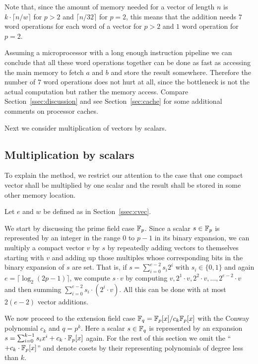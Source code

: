 \begin{Rem}
Note that, since the amount of memory needed for a vector of length $n$
is $k \cdot \lceil n/w \rceil$ for $p > 2$ and $\lceil n/32 \rceil$ for
$p=2$, this means that the addition needs $7$ word operations for each
word of a vector for $p>2$ and $1$ word operation for $p=2$.

Assuming a microprocessor
with a long enough instruction pipeline we can conclude that all these
word operations together
can be done as fast as accessing the main memory to fetch $a$ and $b$ and
store the result somewhere. Therefore the number of $7$ word operations
does not hurt at all, since the bottleneck is not the actual computation
but rather the memory access.
Compare Section~\ref{ssec:discussion} and see Section~\ref{sec:cache}
for some additional comments on processor caches.
\end{Rem}

Next we consider multiplication of vectors by scalars.

\subsection{Multiplication by scalars}

To explain the method, we restrict our attention to the case that one
compact vector shall be multiplied by one scalar and the result 
shall be stored in some other memory location.

Let $e$ and $w$ be defined as in Section~\ref{ssec:cvec}.

We start by discussing the prime field case $\mathbb{F}_p$.
Since a scalar $s \in \mathbb{F}_p$ is represented by an integer in the range $0$ 
to $p-1$ in its binary expansion, we can multiply a compact vector $v$
by $s$ by repeatedly adding vectors to themselves starting with $v$ and
adding up those multiples
whose corresponding bits in the binary expansion of $s$ are set. That is,
if $s = \sum_{i=0}^{e-2} s_i 2^i$ with $s_i \in \{0,1\}$ and again
$e = \lceil \log_2(2p-1) \rceil$, we compute $s\cdot v$ by computing
$v, 2^1 \cdot v, 2^2 \cdot v, \ldots, 2^{e-2} \cdot v$ and then summing
$\sum_{i=0}^{e-2} s_i \cdot (2^i \cdot v)$.
All this can be done with at most $2(e-2)$ vector additions.

We now proceed to the extension field case $\mathbb{F}_q = \mathbb{F}_p[x]/c_k \mathbb{F}_p[x]$ 
with the Conway polynomial $c_k$ and $q = p^k$.
%
Here a scalar $s \in \mathbb{F}_q$ is represented by an expansion
$s = \sum_{i=0}^{k-1} s_i x^i + c_k \cdot \mathbb{F}_p[x]$ again. For the rest of this
section we omit the ``$+ c_k \cdot \mathbb{F}_p[x]$'' and denote cosets
by their representing polynomials of degree less than $k$.

